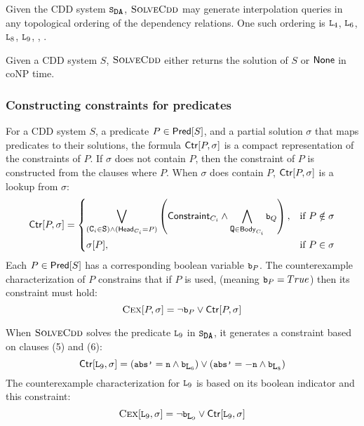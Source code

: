 %
\begin{ex}
  Given the CDD system $\mcchc$, $\textsc{SolveCdd}$ may generate interpolation
  queries in any topological ordering of the dependency relations.
  One such ordering is $\cc{L}_4$, $\cc{L}_6$, $\cc{L}_8$, $\cc{L}_9$, ,
  .
\end{ex}

\begin{thm}
  \label{thm:solve-cp}
  Given a CDD system $S$, $\textsc{SolveCdd}$ either returns the solution of $S$ or $\mathsf{None}$
  in coNP time.
\end{thm}

\subsubsection{Constructing constraints for predicates}
%
For a CDD system $S$, a predicate $P \in \mathsf{Pred}[ S ]$, and a partial
solution $\sigma$ that maps predicates to their solutions, the formula
$\mathsf{Ctr}[P,\sigma]$ is a compact representation of the constraints of $P$.
%
If $\sigma$ does not contain $P$, then the constraint of $P$ is constructed
from the clauses where $P$.  When $\sigma$ does contain $P$, $\mathsf{Ctr}[P,\sigma]$
is a lookup from $\sigma$:
%
\[
  \ctrof{P,\sigma}=
  \begin{dcases}
    \biglor_{(\cc{C}_i \in \cc{S}) \land (\headof{C_i} = P)}
    \left( \consof{C_i} \land %
      \bigland_{ \cc{Q} \in \bodyof{C_i}} \cc{b}_Q
    \right),
  &\text{if } P \notin \sigma\\
  \sigma[P], &\text{if } P \in \sigma
  \end{dcases}
\]
%
Each $P \in \mathsf{Pred}[ S ]$ has a corresponding boolean variable $\cc{b}_P$.
%
The counterexample characterization of $P$ constrains that if $P$ is used,
(meaning $\cc{b}_{P} = True$) then its constraint must hold:
\[
  \vc{P,\sigma} = \neg \cc{b}_{P} \lor \ctrof{P,\sigma}
\]


\begin{ex}
  \label{ex:ctr}
  When $\textsc{SolveCdd}$ solves the predicate $\cc{L}_9$ in $\mcchc$, it generates a
  constraint based on clauses (5) and (6):
  $$\ctrof{\cc{L}_9,\sigma} =
    (\cc{abs'} = \cc{n} \land \cc{b}_{\cc{L}_6})
    \lor
    (\cc{abs'} = -\cc{n} \land \cc{b}_{\cc{L}_8})$$
  The counterexample characterization for $\cc{L}_9$ is based on its boolean
  indicator and this constraint:
  $$\vc{\cc{L}_9,\sigma} = \neg \cc{b}_{\cc{L}_9} \lor \ctrof{\cc{L}_9,\sigma}$$
\end{ex}

